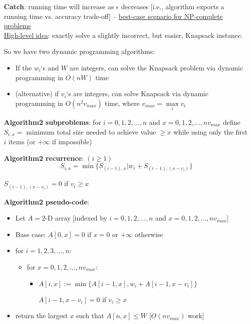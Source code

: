\documentclass[a4paper,12pt]{article}
\theoremstyle{plain}
\theoremstyle{definition}
\theoremstyle{remark}
\begin{document}
\textbf{Catch}: running time will increase as $\epsilon$ decreases [i.e., algorithm exports a running time vs. accuracy trade-off] -- \underline{best-case scenario for NP-complete problems}
\\

\underline{High-level idea}: exactly solve a slightly incorrect, but easier, Knapsack instance.

So we have two dynamic programming algorithms:
\begin{itemize}
	\item If the $w_i$`s and $W$ are integers, can solve the Knapsack problem via dynamic programming in $O(nW)$ time
	\item (alternative) if $v_i$`s are integers, can solve Knapsack via dynamic programming in $O(n^2 v_{max})$ time, where $v_{max} = \max\limits_{i} v_i$
\end{itemize}

\textbf{Algorithm2 subproblems}: for $i = 0, 1, 2, \dots, n$ and $x = 0, 1, 2, \dots, nv_{max}$ define $S_{i,x} =$ minimum total size needed to achieve value $\geq x$ while using only the first $i$ items (or $+\infty$ if impossible)

\textbf{Algorithm2 recurrence}: $(i \geq 1)$
\[
S_{i,x} = \min \{ S_{(i-1),x} | w_i + S_{(i-1), (x-v_i)} \}
\]
\begin{center}$S_{(i-1), (x-v_i)} = 0$ if $v_i \geq x$\end{center}

\textbf{Algorithm2 pseudo-code}:
\begin{itemize}
	\item Let $A = 2$-D array [indexed by $i = 0, 1, 2, \dots, n$ and $x = 0, 1, 2, \dots, nv_{max}$]
	\item Base case: $A[0, x] = 0$ if $x = 0$ or $+\infty$ otherwise
	\item for $i = 1, 2, 3, \dots, n$:
	\begin{itemize}
		\item for $x = 0, 1, 2, \dots, nv_{max}$:
		\begin{itemize}
			\item $A[i, x] := \min \{A[i-1, x], w_i + A[i-1, x-v_i]\}$

			$A[i-1, x-v_i] = 0$ if $v_i \geq x$
		\end{itemize}
	\end{itemize}
	\item return the largest $x$ such that $A[n,x] \leq W$ [$O(nv_{max})$ work]
\end{itemize}
\end{document}
